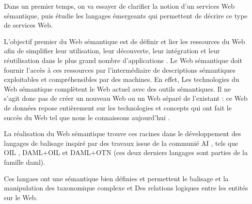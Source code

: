 




Dans un premier temps, on va essayer de clarifier la notion d'un
services Web sémantique, puis étudie les langages émergeants qui
permettent de décrire ce type de services Web.

L'objectif premier du Web sémantique est de définir et lier les
ressources du Web afin de simplifier leur utilisation, leur
découverte, leur intégration et leur réutilisation dans le plus grand
nombre d'applications \cite{berners2001semantic}. Le Web sémantique
doit fournir l'accès à ces ressources par l'intermédiaire de
descriptions sémantiques exploitables et compréhensibles par des
machines. En effet, Les technologies du Web sémantique complètent le
Web actuel avec des outils sémantiques. Il ne s'agit donc pas de créer
un nouveau Web ou un Web séparé de l'existant : ce Web de données
repose entièrement sur les technologies et concepts qui ont fait le
succès du Web tel que nous le connaissons aujourd'hui
\cite{bertails2010web}.

La réalisation du Web sémantique trouve ces racines dans le
développement des langages de balisage inspiré par des travaux issue
de la communié AI \cite{mcilraith2001semantic}, tels que \textsc{OIL}
\cite{fensel2001oil}, \textsc{DAML+OIL} \cite{horrocks2002daml+oil} et
\textsc{DAML+OTN} \cite{mcguinness2003daml} (ces deux derniers
langages sont parties de la famille \acrshort{daml}).

Ces langaes ont une sémantique bien définies et permettent le balisage
et la manipulation des taxonomique complexe et Des relations logiques
entre les entités sur le Web. \cite{fensel2000creating}

